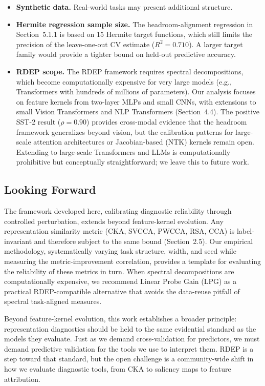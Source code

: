 \documentclass[10pt]{article}
\begin{document}
\begin{itemize}
    \item \textbf{Synthetic data.}  Real-world tasks may present additional structure.
    \item \textbf{Hermite regression sample size.}  The headroom-alignment regression in Section~5.1.1 is based on 15 Hermite target functions, which still limits the precision of the leave-one-out CV estimate ($R^2=0.710$).  A larger target family would provide a tighter bound on held-out predictive accuracy.
    \item \textbf{RDEP scope.}  The RDEP framework requires spectral decompositions, which become computationally expensive for very large models (e.g., Transformers with hundreds of millions of parameters).  Our analysis focuses on feature kernels from two-layer MLPs and small CNNs, with extensions to small Vision Transformers and NLP Transformers (Section~4.4).  The positive SST-2 result ($\rho=0.90$) provides cross-modal evidence that the headroom framework generalizes beyond vision, but the calibration patterns for large-scale attention architectures or Jacobian-based (NTK) kernels remain open.  Extending to large-scale Transformers and LLMs is computationally prohibitive but conceptually straightforward; we leave this to future work.
\end{itemize}

\subsection{Looking Forward}\label{sec:future}

The framework developed here, calibrating diagnostic reliability through controlled perturbation, extends beyond feature-kernel evolution.  Any representation similarity metric (CKA, SVCCA, PWCCA, RSA, CCA) is label-invariant and therefore subject to the same bound (Section~2.5).  Our empirical methodology, systematically varying task structure, width, and seed while measuring the metric-improvement correlation, provides a template for evaluating the reliability of these metrics in turn.  When spectral decompositions are computationally expensive, we recommend Linear Probe Gain (LPG) as a practical RDEP-compatible alternative that avoids the data-reuse pitfall of spectral task-aligned measures.

Beyond feature-kernel evolution, this work establishes a broader principle: representation diagnostics should be held to the same evidential standard as the models they evaluate. Just as we demand cross-validation for predictors, we must demand predictive validation for the tools we use to interpret them. RDEP is a step toward that standard, but the open challenge is a community-wide shift in how we evaluate diagnostic tools, from CKA to saliency maps to feature attribution.
\end{document}
